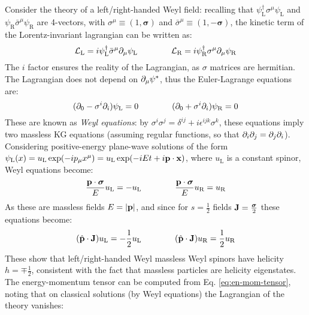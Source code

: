 Consider the theory of a left/right-handed Weyl field: recalling that $ \psi_\text{L}^\dagger \sigma^\mu \psi_\text{L} $ and $ \psi_\text{R} \bar{\sigma}^\mu \psi_\text{R} $ are 4-vectors, with $ \sigma^\mu \equiv (1, \boldsymbol{\sigma}) $ and $ \bar{\sigma}^\mu \equiv (1, - \boldsymbol{\sigma}) $, the kinetic term of the Lorentz-invariant lagrangian can be written as:
\begin{equation}
  \mathcal{L}_\text{L} = i \psi_\text{L}^\dagger \bar{\sigma}^\mu \partial_\mu \psi_\text{L}
  \qquad \qquad
  \mathcal{L}_\text{R} = i \psi_\text{R}^\dagger \sigma^\mu \partial_\mu \psi_\text{R}
\end{equation}
The $ i $ factor ensures the reality of the Lagrangian, as $ \sigma $ matrices are hermitian. The Lagrangian does not depend on $ \partial_\mu \psi^* $, thus the Euler-Lagrange equations are:
\begin{equation}
  (\partial_0 - \sigma^i \partial_i) \psi_\text{L} = 0
  \qquad \qquad
  (\partial_0 + \sigma^i \partial_i) \psi_\text{R} = 0
\end{equation}
These are known as \textit{Weyl equations}: by $ \sigma^i \sigma^j = \delta^{ij} + i \epsilon^{ijk} \sigma^k $, these equations imply two massless KG equations (assuming regular functions, so that $ \partial_i \partial_j = \partial_j \partial_i $). Considering positive-energy plane-wave solutions of the form $ \psi_\text{L}(x) = u_\text{L} \exp(-i p_\mu x^\mu) = u_\text{L} \exp(-i E t + i \mathbf{p} \cdot \mathbf{x}) $, where $ u_\text{L} $ is a constant spinor, Weyl equations become:
\begin{equation*}
  \frac{\mathbf{p} \cdot \boldsymbol{\sigma}}{E} u_\text{L} = - u_\text{L}
  \qquad \qquad
  \frac{\mathbf{p} \cdot \boldsymbol{\sigma}}{E} u_\text{R} = u_\text{R}
\end{equation*}
As these are massless fields $ E = \left\lvert\mathbf{p}\right\rvert $, and since for $ s = \frac{1}{2} $ fields $ \mathbf{J} = \frac{\boldsymbol{\sigma}}{2} $ these equations become:
\begin{equation*}
  (\hat{\mathbf{p}} \cdot \mathbf{J}) u_\text{L} = - \frac{1}{2} u_\text{L}
  \qquad \qquad
  (\hat{\mathbf{p}} \cdot \mathbf{J}) u_\text{R} = \frac{1}{2} u_\text{R}
\end{equation*}
These show that left/right-handed Weyl massless Weyl spinors have helicity $ h = \mp \frac{1}{2} $, consistent with the fact that massless particles are helicity eigenstates.\\
The energy-momentum tensor can be computed from Eq. \ref{eq:en-mom-tensor}, noting that on classical solutions (by Weyl equations) the Lagrangian of the theory vanishes:
